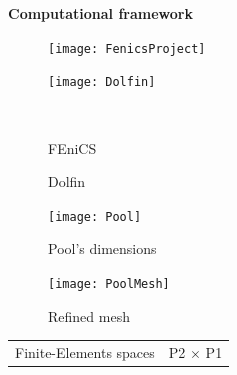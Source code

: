 \documentclass[compress,t]{beamer}
\begin{document}
			\begin{frame}
			\textbf{Computational framework}
				\begin{figure}
				\centering
					\begin{minipage}[b]{0.49\linewidth}
						\centering
						\texttt{[image: FenicsProject]}		
					\end{minipage}
					\hfill
					\begin{minipage}[b]{0.49\linewidth}
						\centering
						\texttt{[image: Dolfin]}
					\end{minipage}\\[-7pt]
					\begin{minipage}[t]{0.49\linewidth}
						\centering
						\caption{FEniCS}
					\end{minipage}
					\hfill
					\begin{minipage}[t]{0.49\linewidth}
						\centering
						\caption{Dolfin}
					\end{minipage}
				\end{figure}
				\begin{figure}	
				\centering
					\begin{minipage}[b]{0.6\linewidth}
					\centering
						\texttt{[image: Pool]}
						\caption{Pool's dimensions}
					\end{minipage}\hfill
					\begin{minipage}[b]{0.3\linewidth}
					\centering
						\texttt{[image: PoolMesh]}
						\caption{Refined mesh}
					\end{minipage}
				\end{figure}								
				\begin{tabular}{l|r}
					Finite-Elements spaces & P2 $\times$ P1 \\				
				\end{tabular}				
			\end{frame}
			
\end{document}
